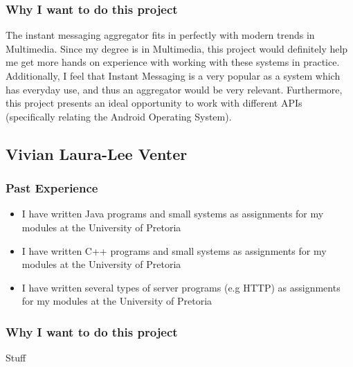 \subsubsection{Why I want to do this project}
The instant messaging aggregator fits in perfectly with modern trends in Multimedia. Since my degree is in Multimedia, this project would definitely help me get more hands on experience with working with these systems in practice. Additionally, I feel that Instant Messaging is a very popular as a system which has everyday use, and thus an aggregator would be very relevant. Furthermore, this project presents an ideal opportunity to work with different APIs (specifically relating the Android Operating System).



\pagebreak
\subsection{Vivian Laura-Lee Venter}

\subsubsection{Past Experience} 
\begin{itemize}
	\item{I have written Java programs and small systems as assignments for my modules at the University of Pretoria}
	\item{I have written C++ programs and small systems as assignments for my modules at the University of Pretoria}
	\item{I have written several types of server programs (e.g HTTP) as assignments for my modules at the University of Pretoria}
\end{itemize}
\subsubsection{Why I want to do this project}
Stuff



